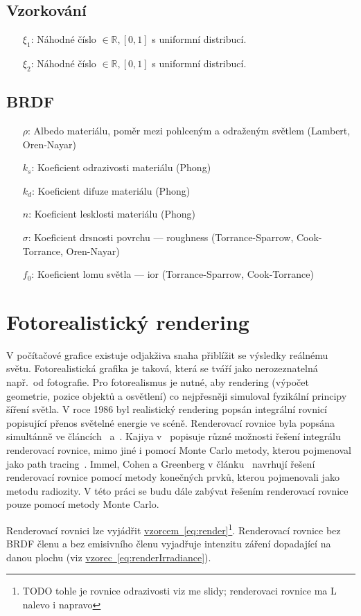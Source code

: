 \documentclass[czech,master]{diploma}
\newcommand{\interval}[1]{\left[{#1}\right]}
\newcommand{\randU}{\xi_{1}}
\newcommand{\randV}{\xi_{2}}
\newcommand{\alb}{\rho}
\newcommand{\rough}{\sigma}
\newcommand{\ior}{f_0}
\begin{document}
\section{Vzorkování}

\begin{itemize}
  \item[\(\randU\):] Náhodné číslo \(\in \mathbb{R}, \interval{0,1}\) s uniformní distribucí.
  \item[\(\randV\):] Náhodné číslo \(\in \mathbb{R}, \interval{0,1}\) s uniformní distribucí.
\end{itemize}

\section{BRDF}

\begin{itemize}
  \item[\(\alb\):] Albedo materiálu, poměr mezi pohlceným a odraženým světlem (Lambert, Oren-Nayar)
  \item[\(k_s\):] Koeficient odrazivosti materiálu (Phong)
  \item[\(k_d\):] Koeficient difuze materiálu (Phong)
  \item[\(n\):] Koeficient lesklosti materiálu (Phong)
  \item[\(\rough\):] Koeficient drsnosti povrchu --- roughness (Torrance-Sparrow, Cook-Torrance, Oren-Nayar)
  \item[\(\ior\):] Koeficient lomu světla --- ior (Torrance-Sparrow, Cook-Torrance)
\end{itemize}

\clearpage
\chapter{Fotorealistický rendering}
V počítačové grafice existuje odjakživa snaha přiblížit se výsledky reálnému světu. Fotorealistická grafika je taková, která se tváří jako nerozeznatelná např.\ od fotografie. Pro fotorealismus je nutné, aby rendering (výpočet geometrie, pozice objektů a osvětlení) co nejpřesněji simuloval fyzikální principy šíření světla. V roce 1986 byl realistický rendering popsán integrální rovnicí popisující přenos světelné energie ve scéně. Renderovací rovnice byla popsána simultánně ve článcích~\cite{KajiyaRenderEq} a~\cite{ImmelRenderEq}. Kajiya v~\cite{KajiyaRenderEq} popisuje různé možnosti řešení integrálu renderovací rovnice, mimo jiné i pomocí Monte Carlo metody, kterou pojmenoval jako path tracing~\cite{HainesRayTracingGems2019}. Immel, Cohen a Greenberg v článku~\cite{ImmelRenderEq} navrhují řešení renderovací rovnice pomocí metody konečných prvků, kterou pojmenovali jako metodu radiozity. V této práci se budu dále zabývat řešením renderovací rovnice pouze pomocí metody Monte Carlo. \par
Renderovací rovnici lze vyjádřit \hyperref[eq:render]{vzorcem~\ref{eq:render}}\footnote{TODO tohle je rovnice odrazivosti viz me slidy;
  renderovaci rovnice ma L nalevo i napravo}. Renderovací rovnice bez BRDF členu a bez emisivního členu vyjadřuje intenzitu záření dopadající na danou plochu (viz \hyperref[eq:renderIrradiance]{vzorec~\ref{eq:renderIrradiance}})\cite{Dutre2003GICompendum}.
\end{document}
